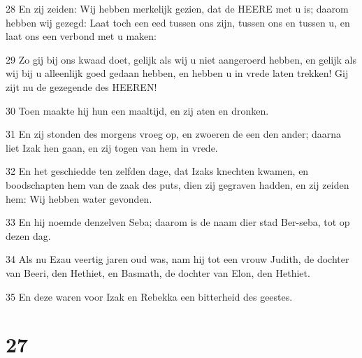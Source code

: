 \par 28 En zij zeiden: Wij hebben merkelijk gezien, dat de HEERE met u is; daarom hebben wij gezegd: Laat toch een eed tussen ons zijn, tussen ons en tussen u, en laat ons een verbond met u maken:
\par 29 Zo gij bij ons kwaad doet, gelijk als wij u niet aangeroerd hebben, en gelijk als wij bij u alleenlijk goed gedaan hebben, en hebben u in vrede laten trekken! Gij zijt nu de gezegende des HEEREN!
\par 30 Toen maakte hij hun een maaltijd, en zij aten en dronken.
\par 31 En zij stonden des morgens vroeg op, en zwoeren de een den ander; daarna liet Izak hen gaan, en zij togen van hem in vrede.
\par 32 En het geschiedde ten zelfden dage, dat Izaks knechten kwamen, en boodschapten hem van de zaak des puts, dien zij gegraven hadden, en zij zeiden hem: Wij hebben water gevonden.
\par 33 En hij noemde denzelven Seba; daarom is de naam dier stad Ber-seba, tot op dezen dag.
\par 34 Als nu Ezau veertig jaren oud was, nam hij tot een vrouw Judith, de dochter van Beeri, den Hethiet, en Basmath, de dochter van Elon, den Hethiet.
\par 35 En deze waren voor Izak en Rebekka een bitterheid des geestes.

\chapter{27}


